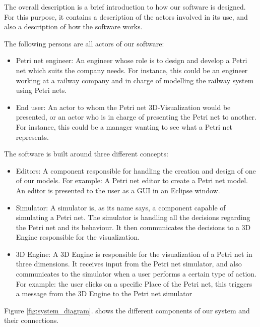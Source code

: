 The overall description is a brief introduction to how our software is designed. For this purpose, it contains a description of the actors involved in its use, and also a description of how the software works. \newline

The following persons are all actors of our software:

\begin{itemize}
  \item Petri net engineer: An engineer whose role is to design and develop a Petri net which suits the company needs. \newline
  For instance, this could be an engineer working at a railway company and in charge of modelling the railway system using Petri nets.
  \item End user: An actor to whom the Petri net 3D-Visualization would be presented, or an actor who is in charge of presenting the Petri net to another. \newline
	For instance, this could be a manager wanting to see what a Petri net represents. 
\end{itemize}

The software is built around three different concepts: 

\begin{itemize}
  \item Editors: A component responsible for handling the creation and design of one of our models. \newline
	For example: A Petri net editor to create a Petri net model. \newline
	An editor is presented to the user as a GUI in an Eclipse window.
  \item Simulator: A simulator is, as its name says, a component capable of simulating a Petri net.
	The simulator is handling all the decisions regarding the Petri net and its behaviour. 
	It then communicates the decisions to a 3D Engine responsible for the visualization.
  \item 3D Engine: A 3D Engine is responsible for the visualization of a Petri net in three dimensions.
	It receives input from the Petri net simulator, and also communicates to the simulator when a user performs a certain type of action. \newline
	For example: the user clicks on a specific Place of the Petri net, this triggers a message from the 3D Engine to the Petri net simulator 
\end{itemize}
\newpage
Figure \ref{fig:system_diagram}. shows the different components of our system and their connections.

